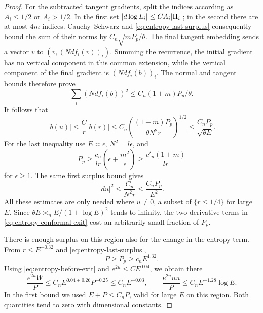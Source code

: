 \begin{proof}
For the subtracted tangent gradients, split the indices according as
\(A_i\leq1/2\) or \(A_i>1/2\).  In the first set
\(|d\log L_i|\leq C A_i|\mathrm{II}_i|\); in the second there are at most
\(4m\) indices.  Cauchy--Schwarz and
\eqref{eq:entropy-last-surplus} consequently bound the sum of their
norms by \(C_n\sqrt{mP_p/\theta}\).  The final tangent embedding sends
a vector \(v\) to \((v,(Ndf_i(v))_i)\).  Summing the recurrence, the
initial gradient has no vertical component in this common extension,
while the vertical component of the final gradient is
\((Ndf_i(b))_i\).
The normal and tangent bounds therefore prove
\[
 \sum_i(Ndf_i(b))^2\leq C_n(1+m)P_p/\theta.
\]
It follows that
\[
 |b(u)|\leq\frac C r|b(r)|
 \leq C_n\left(\frac{(1+m)P_p}{\theta N^2r}\right)^{1/2}
 \leq \frac{C_nP_p}{\sqrt{\theta E}}.
\]
For the last inequality use \(E\asymp\epsilon\), \(N^2=l\epsilon\),
and
\[
 P_p\geq\frac{c_n}{lr}
       \left(\epsilon+\frac{m^2}{\epsilon}\right)
       \geq \frac{c'_n(1+m)}{lr}
\]
for \(\epsilon\geq1\).  The same first surplus bound gives
\begin{equation}\label{eq:entropy-exit-derivatives}
 |du|^2\leq\frac{C_n}{N^2r}\leq\frac{C_nP_p}{E^2}.
\end{equation}
All these estimates are only needed where \(u\ne0\), a subset of
\(\{r\leq1/4\}\) for large \(E\).  Since
\(\theta E\asymp_n E/(1+\log E)^2\) tends to infinity, the two
derivative terms in \eqref{eq:entropy-conformal-exit} cost an
arbitrarily small fraction of \(P_p\).

There is enough surplus on this region also for the change in the
entropy term.  From \(r\leq E^{-0.32}\) and
\eqref{eq:entropy-last-surplus},
\[
 P\geq P_p\geq c_n E^{1.32}.
\]
Using \eqref{eq:entropy-before-exit} and \(e^{2u}\leq C E^{0.04}\),
we obtain there
\begin{equation}\label{eq:entropy-exit-volume-cost}
 \frac{e^{2u}W}{P}\leq
 C_nE^{0.04+0.26}P^{-0.25}\leq C_nE^{-0.03},
 \qquad
 \frac{e^{2u}nu}{P}\leq C_nE^{-1.28}\log E.
\end{equation}
In the first bound we used \(E+P\leq C_nP\), valid for large \(E\)
on this region.  Both quantities tend to zero with dimensional
constants.


\end{proof}
